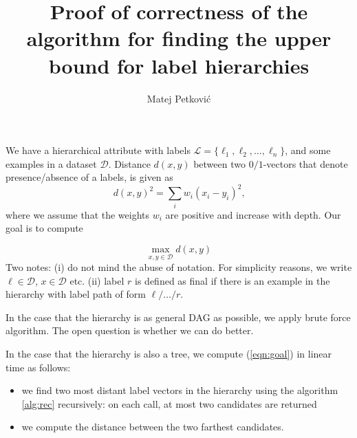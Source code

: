 \documentclass[12pt,a4paper]{article}
\title{Proof of correctness of the algorithm for finding the upper bound for label hierarchies}
\author{Matej Petković}
\begin{document}
\maketitle

We have a hierarchical attribute with labels $\mathcal{L} = \{\ell_1, \ell_2, \dots, \ell_n\}$, and some examples
in a dataset $\mathcal{D}$. Distance $d(x,y)$ between two $0/1$-vectors that denote presence/absence of a labels,
is given as
$$
d(x, y)^2 = \sum_i w_i (x_i - y_i)^2\text{,}
$$
where we assume that the weights $w_i$ are positive and increase with depth. Our goal is to compute

\begin{equation}
\label{eqn:goal}
\max_{x, y\in\mathcal{D}} d(x, y)
\end{equation}
Two notes: (i) do not mind the abuse of notation. For simplicity reasons, we write $\ell\in \mathcal{D}$, $x\in\mathcal{D}$ etc. (ii)
label $r$ is defined as final if there is an example in the hierarchy with label path of form $\ell/\dots/r$.

In the case that the  hierarchy is as general DAG as possible, we apply brute force algorithm. The open question is whether we can do better.

In the case that the hierarchy is also a tree, we compute (\ref{eqn:goal}) in linear time as follows:
\begin{itemize}
	\item we find two most distant label vectors in the hierarchy using the algorithm \ref{alg:rec} recursively:
	on each call, at most two candidates are returned
	\item we compute the distance between the two farthest candidates.
\end{itemize}
\end{document}
